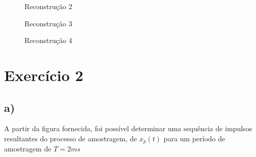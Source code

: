 \documentclass{article}[a4paper,12pt,twoside]
\begin{document}
\begin{figure}[H]
    \centering
    \caption{Reconstrução 2}
    \label{fig:my_label}
\end{figure}

\begin{figure}[H]
    \centering
    \caption{Reconstrução 3}
    \label{fig:my_label}
\end{figure}

\begin{figure}[H]
    \centering
    \caption{Reconstrução 4}
    \label{fig:my_label}
\end{figure}

\section{Exercício 2}
\subsection{a)}
A partir da figura fornecida, foi possível determinar uma sequência de impulsos resultantes do processo de amostragem, de $x_p(t)$ para um período de amostragem de $T = 2ms$
\end{document}
